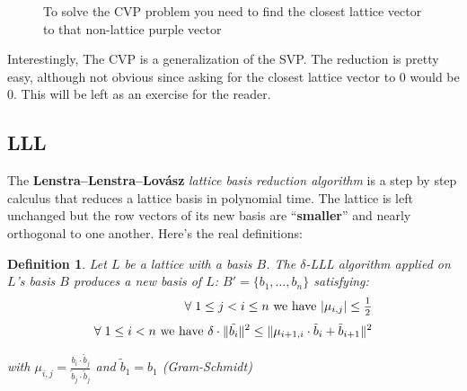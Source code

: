 \documentclass[a4paper,11pt]{article}
\newtheorem{definition}{Definition}
\begin{document}
\begin{figure}[H]
  \caption{To solve the CVP problem you need to find the closest lattice vector to that non-lattice purple vector}
\end{figure}

Interestingly, The CVP is a generalization of the SVP. The reduction is pretty easy, although not obvious since asking for the closest lattice vector to $0$ would be $0$. This will be left as an exercise for the reader.

\subsection{LLL}


The \textbf{Lenstra–Lenstra–Lovász} \textit{lattice basis reduction algorithm} is a step by step calculus that reduces a lattice basis in polynomial time. The lattice is left unchanged but the row vectors of its new basis are ``\textbf{smaller}'' and nearly orthogonal to one another. Here's the real definitions:

\begin{definition}
Let $L$ be a lattice with a basis $B$. The $\delta$-LLL algorithm applied on $L$'s basis $B$ produces a new basis of $L$: $B' = \{b_1,\hdots,b_n\}$ satisfying:
\begin{eqnarray}
\forall \hspace{1mm} 1 \leq j < i \leq n \text{ we have } |\mu_{i,j}| \leq \frac{_1}{^2}\\
\forall \hspace{1mm} 1 \leq i < n \text{ we have } \delta \cdot \|\tilde{b_i}\|^2 \leq \| \mu_{i+1,i}\cdot \tilde{b}_i + \tilde{b}_{i + 1}\|^2
\end{eqnarray}
\begin{center}
with $\mu_{i,j} = \frac{b_i \cdot \tilde{b}_j}{\tilde{b}_j \cdot \tilde{b}_j}$ and $\tilde{b}_1 = b_1$ (Gram-Schmidt)
\end{center}
\end{definition}
\end{document}
